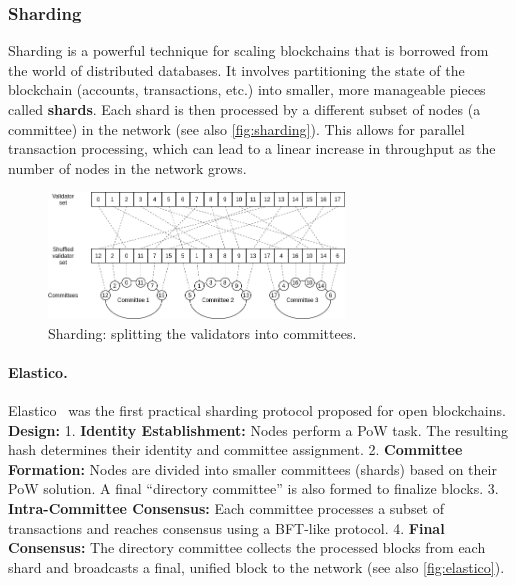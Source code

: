 \subsubsection{Sharding}\label{sharding}

Sharding is a powerful technique for scaling blockchains that is
borrowed from the world of distributed databases. It involves
partitioning the state of the blockchain (accounts, transactions, etc.)
into smaller, more manageable pieces called \textbf{shards}. Each shard
is then processed by a different subset of nodes (a committee) in the
network (see also \autoref{fig:sharding}). This allows for parallel transaction processing, which can lead
to a linear increase in throughput as the number of nodes in the network
grows.


\begin{figure}[t]
	\begin{center}
		\includegraphics[width=0.7\textwidth]{./figs/sharding.png}
		\caption{Sharding: splitting the validators into committees.}		
		\label{fig:sharding}
	\end{center}	
\end{figure}


\paragraph{Elastico.}\label{elastico}
Elastico~\cite{luu2016secure} was the first practical sharding protocol proposed for open
blockchains.
%
\textbf{Design:} 1. \textbf{Identity Establishment:} Nodes perform a PoW
task. The resulting hash determines their identity and committee
assignment. 2. \textbf{Committee Formation:} Nodes are divided into
smaller committees (shards) based on their PoW solution. A final
``directory committee'' is also formed to finalize blocks. 3.
\textbf{Intra-Committee Consensus:} Each committee processes a subset of
transactions and reaches consensus using a BFT-like protocol. 4.
\textbf{Final Consensus:} The directory committee collects the processed
blocks from each shard and broadcasts a final, unified block to the
network (see also \autoref{fig:elastico}).

